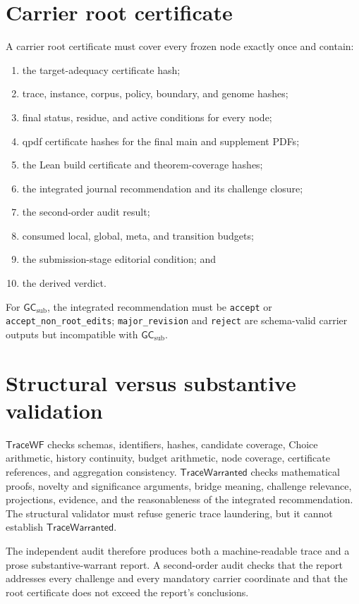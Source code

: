 \documentclass[10pt]{article}
\newcommand{\TraceWF}{\mathsf{TraceWF}}
\newcommand{\TraceW}{\mathsf{TraceWarranted}}
\newcommand{\GCsub}{\mathsf{GC}_{\mathrm{sub}}}
\begin{document}
\section{Carrier root certificate}

A carrier root certificate must cover every frozen node exactly once and contain:
\begin{enumerate}
  \item the target-adequacy certificate hash;
  \item trace, instance, corpus, policy, boundary, and genome hashes;
  \item final status, residue, and active conditions for every node;
  \item qpdf certificate hashes for the final main and supplement PDFs;
  \item the Lean build certificate and theorem-coverage hashes;
  \item the integrated journal recommendation and its challenge closure;
  \item the second-order audit result;
  \item consumed local, global, meta, and transition budgets;
  \item the submission-stage editorial condition; and
  \item the derived verdict.
\end{enumerate}
For $\GCsub$, the integrated recommendation must be \texttt{accept} or \texttt{accept\_non\_root\_edits}; \texttt{major\_revision} and \texttt{reject} are schema-valid carrier outputs but incompatible with $\GCsub$.

\section{Structural versus substantive validation}

$\TraceWF$ checks schemas, identifiers, hashes, candidate coverage, Choice arithmetic, history continuity, budget arithmetic, node coverage, certificate references, and aggregation consistency.  $\TraceW$ checks mathematical proofs, novelty and significance arguments, bridge meaning, challenge relevance, projections, evidence, and the reasonableness of the integrated recommendation.  The structural validator must refuse generic trace laundering, but it cannot establish $\TraceW$.

The independent audit therefore produces both a machine-readable trace and a prose substantive-warrant report.  A second-order audit checks that the report addresses every challenge and every mandatory carrier coordinate and that the root certificate does not exceed the report's conclusions.
\end{document}
